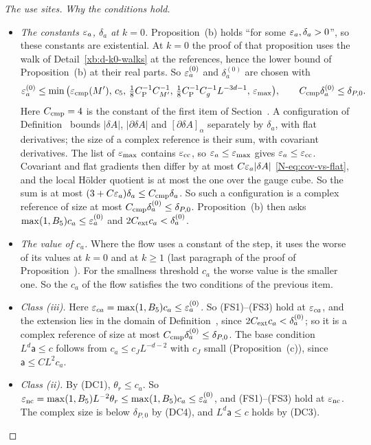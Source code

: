 \begin{proof}[The use sites]
\emph{Why the conditions hold.}
\begin{itemize}
\item \emph{The constants $\varepsilon_a$, $\delta_a$ at $k=0$.} Proposition~(b) holds ``for some $\varepsilon_a,\delta_a>0$'', so these constants are existential. At $k=0$ the proof of that proposition uses the walk of Detail~\ref{xb:d-k0-walks} at the references, hence the lower bound of Proposition~(b) at their real parts. So $\varepsilon_a^{(0)}$ and $\delta^{(0)}_a$ are chosen with
\[
\varepsilon_a^{(0)}\le\min\big(\varepsilon_{\rm cmp}(M'),\,c_5,\,\tfrac18C_{\rm P}^{-1}C_{M'}^{-1},\,\tfrac18C_{\rm P}^{-1}C_g^{-1}L^{-3d-1},\,\varepsilon_{\max}\big),\qquad C_{\rm cmp}\delta^{(0)}_a\le\delta_{P,0}.
\]
Here $C_{\rm cmp}=4$ is the constant of the first item of Section~. A configuration of Definition~ bounds $|\delta A|$, $|\partial\delta A|$ and $[\partial\delta A]_\alpha$ separately by $\delta_a$, with flat derivatives; the size of a complex reference is their sum, with covariant derivatives. The list of $\varepsilon_{\max}$ contains $\varepsilon_{\rm cc}$, so $\varepsilon_a\le\varepsilon_{\max}$ gives $\varepsilon_a\le\varepsilon_{\rm cc}$. Covariant and flat gradients then differ by at most $C\varepsilon_a|\delta A|$ \eqref{N-eq:cov-vs-flat}, and the local H\"older quotient is at most the one over the gauge cube. So the sum is at most $(3+C\varepsilon_a)\delta_a\le C_{\rm cmp}\delta_a$. So such a configuration is a complex reference of size at most $C_{\rm cmp}\delta^{(0)}_a\le\delta_{P,0}$. Proposition~(b) then asks $\max(1,B_5)c_a\le\varepsilon^{(0)}_a$ and $2C_{\rm ext}c_a<\delta^{(0)}_a$.
\item \emph{The value of $c_a$.} Where the flow uses a constant of the step, it uses the worse of its values at $k=0$ and at $k\ge1$ (last paragraph of the proof of Proposition~). For the smallness threshold $c_a$ the worse value is the smaller one. So the $c_a$ of the flow satisfies the two conditions of the previous item.
\item \emph{Class (iii).} Here $\varepsilon_{ca}=\max(1,B_5)c_a\le\varepsilon^{(0)}_a$. So (FS1)--(FS3) hold at $\varepsilon_{ca}$, and the extension lies in the domain of Definition~, since $2C_{\rm ext}c_a<\delta^{(0)}_a$; so it is a complex reference of size at most $C_{\rm cmp}\delta^{(0)}_a\le\delta_{P,0}$. The base condition $L^d\mathsf a\le c$ follows from $c_a\le c_JL^{-d-2}$ with $c_J$ small (Proposition~(c)), since $\mathsf a\le CL^2c_a$.
\item \emph{Class (ii).} By (DC1), $\theta_r\le c_a$. So $\varepsilon_{\rm nc}=\max(1,B_5)L^{-2}\theta_r\le\max(1,B_5)c_a\le\varepsilon^{(0)}_a$, and (FS1)--(FS3) hold at $\varepsilon_{\rm nc}$. The complex size is below $\delta_{P,0}$ by (DC4), and $L^d\mathsf a\le c$ holds by (DC3).

\end{itemize}
\end{proof}
